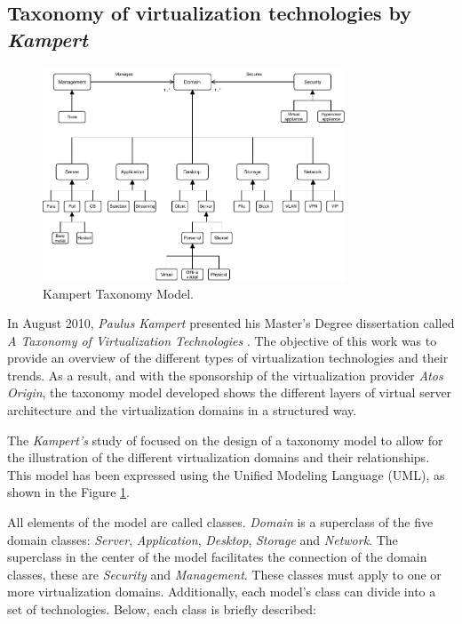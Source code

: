 	\subsection{Taxonomy of virtualization technologies by \textit{Kampert}}
	
	\begin{figure}[!hbtp]
		\centering
		\includegraphics[width=9cm]{images/Kampert2010.pdf}
		\vspace{-0.2cm}
		\caption{Kampert Taxonomy Model\footnotemark[6]{}.}
		\label{fig:KampertTaxonomyModel2010}
	\end{figure}
	

	In August 2010, \textit {Paulus Kampert} presented his Master's Degree dissertation called \textit{A Taxonomy of Virtualization Technologies} \cite{Kampert2010}. The objective of this work was to provide an overview of the different types of virtualization technologies and their trends. As a result, and with the sponsorship of the virtualization provider \textit{Atos Origin}, the taxonomy model developed shows the different layers of virtual server architecture and the virtualization domains in a structured way.
	
	The \textit{Kampert's} study of focused on the design of a taxonomy model to allow for the illustration of the different virtualization domains and their relationships. This model has been expressed using the Unified Modeling Language (UML), as shown in the Figure \ref{fig:KampertTaxonomyModel2010}.
	
	All elements of the model are called classes. \textit{Domain} is a superclass of the five domain classes: \textit{Server}, \textit{Application}, \textit{Desktop}, \textit {Storage} and \textit {Network}. The superclass in the center of the model facilitates the connection of the domain classes,
	these are \textit{Security} and \textit {Management}. These classes must apply to one or more virtualization domains. Additionally, each model's class can divide into a set of technologies. Below, each class is briefly described:
	

